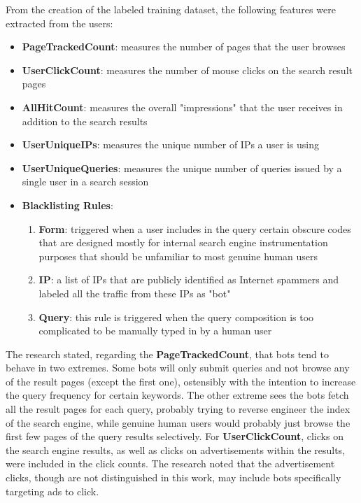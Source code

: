 From the creation of the labeled training dataset, the following features were extracted from the users:
\begin{itemize}
    \item \textbf{PageTrackedCount}: measures the number of pages that the user browses
    \item \textbf{UserClickCount}: measures the number of mouse clicks on the search result pages
    \item \textbf{AllHitCount}: measures the overall "impressions" that the user receives in addition to the search results
    \item \textbf{UserUniqueIPs}: measures the unique number of IPs a user is using
    \item \textbf{UserUniqueQueries}: measures the unique number of queries issued by a single user in a search session
    \item \textbf{Blacklisting Rules}:
    \begin{enumerate}
        \item \textbf{Form}: triggered when a user includes in the query certain obscure codes that are designed mostly for internal search engine instrumentation purposes that should be unfamiliar to most genuine human users
        \item \textbf{IP}: a list of IPs that are publicly identified as Internet spammers and labeled all the traffic from these IPs as "bot"
        \item \textbf{Query}:  this rule is triggered when the query composition is too complicated to be manually typed in by a human user
    \end{enumerate}
\end{itemize}
The research stated, regarding the \textbf{PageTrackedCount}, that bots tend to behave in two extremes.
Some bots will only submit queries and not browse any of the result pages (except the first one), ostensibly with the intention to increase the query frequency for certain keywords.
The other extreme sees the bots fetch all the result pages for each query, probably trying to reverse engineer the index of the search engine, while genuine human users would probably just browse the first few pages of the query results selectively.
For \textbf{UserClickCount}, clicks on the search engine results, as well as clicks on advertisements within the results, were included in the click counts.
The research noted that the advertisement clicks, though are not distinguished in this work, may include bots specifically targeting ads to click.

